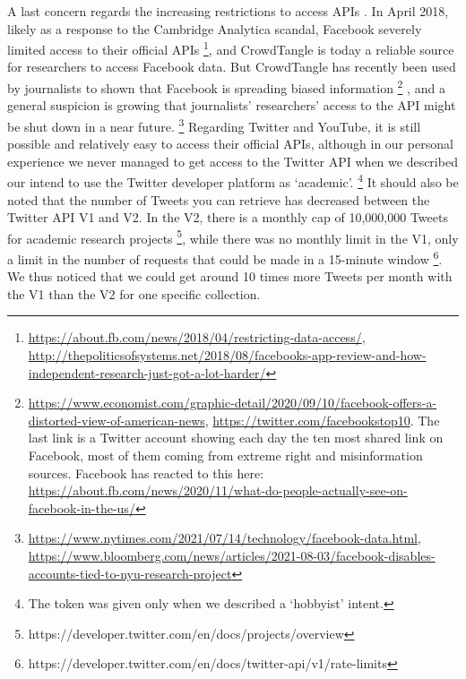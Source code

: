 \documentclass{article}
\begin{document}
A last concern regards the increasing restrictions to access APIs \cite{api}.
In April 2018, likely as a response to the Cambridge Analytica scandal, Facebook severely limited access to their official APIs
\footnote{\url{https://about.fb.com/news/2018/04/restricting-data-access/}, \url{http://thepoliticsofsystems.net/2018/08/facebooks-app-review-and-how-independent-research-just-got-a-lot-harder/}}, 
and CrowdTangle is today a reliable source for researchers to access Facebook data. 
But CrowdTangle has recently been used by journalists to shown that Facebook is spreading biased information
\footnote{\url{https://www.economist.com/graphic-detail/2020/09/10/facebook-offers-a-distorted-view-of-american-news}, \url{https://twitter.com/facebookstop10}. 
The last link is a Twitter account showing each day the ten most shared link on Facebook, most of them coming from extreme right and misinformation sources. 
Facebook has reacted to this here: \url{https://about.fb.com/news/2020/11/what-do-people-actually-see-on-facebook-in-the-us/}}
, and a general suspicion is growing that journalists' researchers' access to the API might be shut down in a near future.
\footnote{\url{https://www.nytimes.com/2021/07/14/technology/facebook-data.html}, \url{https://www.bloomberg.com/news/articles/2021-08-03/facebook-disables-accounts-tied-to-nyu-research-project}}
Regarding Twitter and YouTube, it is still possible and relatively easy to access their official APIs, although in our personal experience we never managed to get access to the Twitter API when we described our intend to use the Twitter developer platform as `academic'.
\footnote{The token was given only when we described a `hobbyist' intent.}
It should also be noted that the number of Tweets you can retrieve has decreased between the Twitter API V1 and V2. 
In the V2, there is a monthly cap of 10,000,000 Tweets for academic research projects
\footnote{https://developer.twitter.com/en/docs/projects/overview},
while there was no monthly limit in the V1, only a limit in the number of requests that could be made in a 15-minute window
\footnote{https://developer.twitter.com/en/docs/twitter-api/v1/rate-limits}.
We thus noticed that we could get around 10 times more Tweets per month with the V1 than the V2 for one specific collection.

\smallskip
\end{document}
